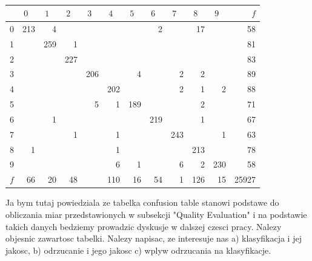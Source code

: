 \documentclass{llncs}
\begin{document}
\begin{table}[h]
\centering
\caption{\color{red}{Tutaj Confusion Table, np. test set z pliku "Ellipsoids results new format ratio 7/3.xls" przeslanego 11 marca dla TOL=0.2 ACC=0.001. Zalaczam przykladowa tabelke, gdzie wyniki sa w procentach, ale u nas niech beda liczby bezwzgledne. Pominiete sa zera dla wiekszej czytelnosci, niewypelnione foreign.} \protect\linebreak
\color{green}{Tutaj wrzuciłam dla TOL=0.2 ACC=0.1 z pliku Ellipsoids\_results new format ratio 7-3} }
\setlength{\tabcolsep}{3pt}
\renewcommand{\arraystretch}{1}

{\small
\begin{tabular}{|c||r|r|r|r|r|r|r|r|r|r|r|}
\hline
 \hspace{15pt} & $0\;\;\;$ & $1\;\;\;$ & $2\;\;\;$ & $3\;\;\;$ & $4\;\;\;$ & $5\;\;\;$ & $6\;\;\;$ & $7\;\;\;$ & $8\;\;\;$ & $9\;\;\;$ & $f$ \\
\hline\hline
  0 & 213 & 4 &   &   &   &   & 2 &   & 17 &   & 58\\
\hline
  1 &  & 259 & 1 &   &   &   &   &   &   &   & 81\\
\hline
  2 &  &   & 227 &   &   &   &   &   &   &   & 83\\
\hline
  3 &  &   &   & 206 &   & 4 &   & 2 & 2 &   & 89\\
\hline
  4 &  &   &   &   & 202 &   &   & 2 & 1 & 2 & 88\\
\hline
  5 &  &   &   & 5 & 1 & 189 &   &   & 2 &   & 71\\
\hline
  6 &  & 1 &   &   &   &   & 219 &   & 1 &   & 67\\
\hline
  7 &  &   & 1 &   & 1 &   &   & 243 &   & 1 & 63\\
\hline
  8 & 1 &   &   &   & 1 &   &   &   & 213 &   & 78\\
\hline
  9 &  &   &   &   & 6 & 1 &   & 6 & 2 & 230 & 58\\
\hline
$f$ & 66 & 20 & 48 &   & 110  & 16 & 54 & 1 & 126 & 15 & 25927\\
\hline
\end{tabular}
}

\label{tab:CofusionTable}
\end{table}

{\color{blue}Ja bym tutaj powiedziala ze tabelka confusion table stanowi podstawe do obliczania miar przedstawionych w subsekcji "Quality Evaluation" i na podstawie takich danych bedziemy prowadzic dyskusje w dalszej czesci pracy.  Nalezy objesnic zawartosc tabelki. Nalezy napisac, ze interesuje nas a) klasyfikacja i jej jakosc, b) odrzucanie i jego jakosc c) wplyw odrzucania na klasyfikacje. }
\end{document}
